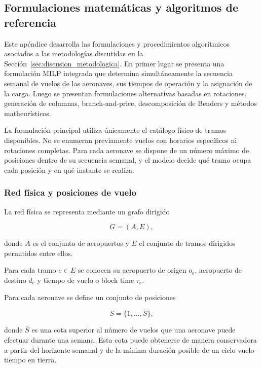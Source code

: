 
\subsection{Formulaciones matemáticas y algoritmos de referencia}
\label{app:metodologia}

Este apéndice desarrolla las formulaciones y procedimientos algorítmicos asociados a las
metodologías discutidas en la Sección~\ref{sec:discusion_metodologica}. En primer lugar se
presenta una formulación MILP integrada que determina simultáneamente la secuencia semanal
de vuelos de las aeronaves, sus tiempos de operación y la asignación de la carga. Luego se
presentan formulaciones alternativas basadas en rotaciones, generación de columnas,
branch-and-price, descomposición de Benders y métodos matheurísticos.

La formulación principal utiliza únicamente el catálogo físico de tramos disponibles.
No se enumeran previamente vuelos con horarios específicos ni rotaciones completas. Para
cada aeronave se dispone de un número máximo de posiciones dentro de su secuencia semanal,
y el modelo decide qué tramo ocupa cada posición y en qué instante se realiza.


\subsubsection{Red física y posiciones de vuelo}
\label{app:red_fisica}

La red física se representa mediante un grafo dirigido

\[
G=(A,E),
\]

donde $A$ es el conjunto de aeropuertos y $E$ el conjunto de tramos dirigidos permitidos
entre ellos.

Para cada tramo $e\in E$ se conocen su aeropuerto de origen $o_e$, aeropuerto de destino
$d_e$ y tiempo de vuelo o block time $\tau_e$.

Para cada aeronave se define un conjunto de posiciones

\[
S=\{1,\ldots,\bar S\},
\]

donde $\bar S$ es una cota superior al número de vuelos que una aeronave puede efectuar
durante una semana. Esta cota puede obtenerse de manera conservadora a partir del horizonte
semanal y de la mínima duración posible de un ciclo vuelo--tiempo en tierra.

